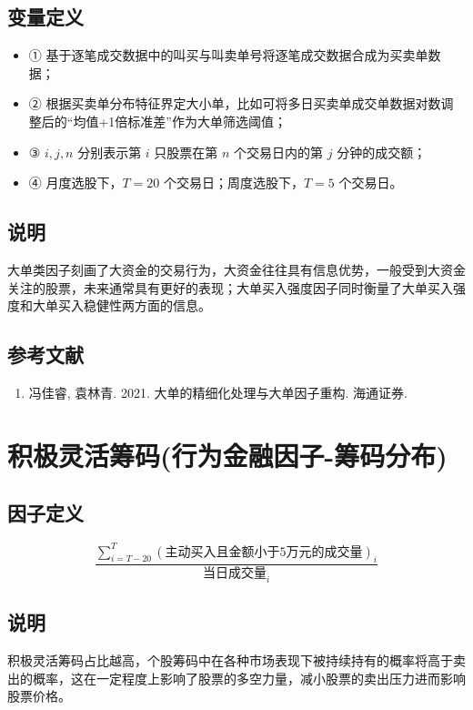 \documentclass{article}
\begin{document}
\subsection{变量定义}
\begin{itemize}
    \item ① 基于逐笔成交数据中的叫买与叫卖单号将逐笔成交数据合成为买卖单数据；
    \item ② 根据买卖单分布特征界定大小单，比如可将多日买卖单成交单数据对数调整后的“均值+1倍标准差”作为大单筛选阈值；
    \item ③ \( i, j, n \) 分别表示第 \( i \) 只股票在第 \( n \) 个交易日内的第 \( j \) 分钟的成交额；
    \item ④ 月度选股下，\( T = 20 \) 个交易日；周度选股下，\( T = 5 \) 个交易日。
\end{itemize}

\subsection{说明}
大单类因子刻画了大资金的交易行为，大资金往往具有信息优势，一般受到大资金关注的股票，未来通常具有更好的表现；大单买入强度因子同时衡量了大单买入强度和大单买入稳健性两方面的信息。

\subsection{参考文献}
\begin{enumerate}
    \item 冯佳睿, 袁林青. 2021. 大单的精细化处理与大单因子重构. 海通证券.
\end{enumerate}

\section{积极灵活筹码(行为金融因子-筹码分布)}

\subsection{因子定义}

\begin{equation}
    \frac{\sum_{i=T-20}^{T} \left( \text{主动买入且金额小于5万元的成交量} \right)_{i}}{ \text{当日成交量}_{i}}
\end{equation}


\subsection{说明}
积极灵活筹码占比越高，个股筹码中在各种市场表现下被持续持有的概率将高于卖出的概率，这在一定程度上影响了股票的多空力量，减小股票的卖出压力进而影响股票价格。
\end{document}
